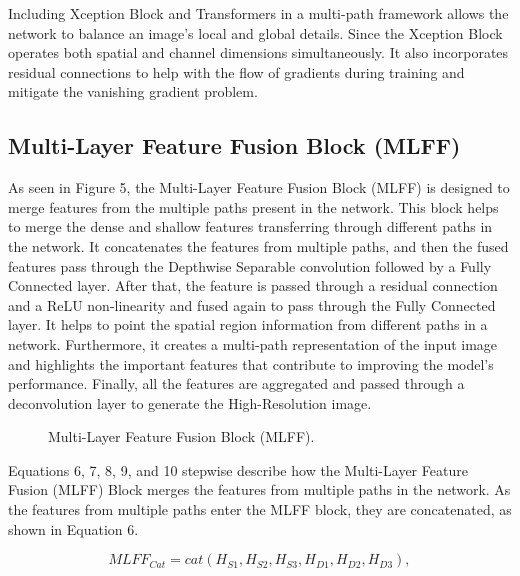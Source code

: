 \documentclass[twocolumn]{svjour3}          %
\begin{document}
Including Xception Block and Transformers in a multi-path framework allows the network to balance an image's local and global details. Since the Xception Block operates both spatial and channel dimensions simultaneously. It also incorporates residual connections to help with the flow of gradients during training and mitigate the vanishing gradient problem. 

\subsection{Multi-Layer Feature Fusion Block (MLFF)}

As seen in Figure 5, the Multi-Layer Feature Fusion Block (MLFF) is designed to merge features from the multiple paths present in the network. This block helps to merge the dense and shallow features transferring through different paths in the network. It concatenates the features from multiple paths, and then the fused features pass through the Depthwise Separable convolution followed by a Fully Connected layer. After that, the feature is passed through a residual connection and a ReLU non-linearity and fused again to pass through the Fully Connected layer. It helps to point the spatial region information from different paths in a network. Furthermore, it creates a multi-path representation of the input image and highlights the important features that contribute to improving the model's performance. Finally, all the features are aggregated and passed through a deconvolution layer to generate the High-Resolution image.

\begin{figure}
  \centering
   \caption {Multi-Layer Feature Fusion Block (MLFF).}
    \label{fig:5}
\end{figure}

Equations 6, 7, 8, 9, and 10 stepwise describe how the Multi-Layer Feature Fusion (MLFF) Block merges the features from multiple paths in the network. As the features from multiple paths enter the MLFF block, they are concatenated, as shown in Equation 6.

\begin{equation}
{MLFF_{Cat}}= {cat}({H_{S1}},{H_{S2}},{H_{S3}},{H_{D1}},{H_{D2}},{H_{D3}}),
\end{equation}
\end{document}
